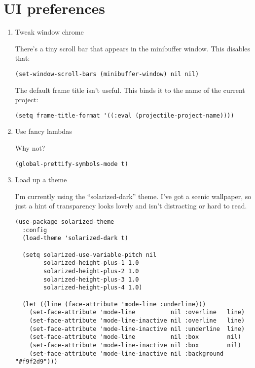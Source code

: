 \documentclass{article}
\begin{document}
\section{UI preferences}
\label{sec:orgae8d529}
\begin{enumerate}
\item Tweak window chrome
\label{sec:orgf8b1ac3}

There's a tiny scroll bar that appears in the minibuffer window. This disables
that:

\begin{verbatim}
(set-window-scroll-bars (minibuffer-window) nil nil)
\end{verbatim}

The default frame title isn't useful. This binds it to the name of the current
project:

\begin{verbatim}
(setq frame-title-format '((:eval (projectile-project-name))))
\end{verbatim}

\item Use fancy lambdas
\label{sec:orga78c289}

Why not?

\begin{verbatim}
(global-prettify-symbols-mode t)
\end{verbatim}

\item Load up a theme
\label{sec:orga727097}

I'm currently using the ``solarized-dark'' theme. I've got a scenic wallpaper, so
just a hint of transparency looks lovely and isn't distracting or hard to read.

\begin{verbatim}
(use-package solarized-theme
  :config
  (load-theme 'solarized-dark t)

  (setq solarized-use-variable-pitch nil
		solarized-height-plus-1 1.0
		solarized-height-plus-2 1.0
		solarized-height-plus-3 1.0
		solarized-height-plus-4 1.0)

  (let ((line (face-attribute 'mode-line :underline)))
	(set-face-attribute 'mode-line          nil :overline   line)
	(set-face-attribute 'mode-line-inactive nil :overline   line)
	(set-face-attribute 'mode-line-inactive nil :underline  line)
	(set-face-attribute 'mode-line          nil :box        nil)
	(set-face-attribute 'mode-line-inactive nil :box        nil)
	(set-face-attribute 'mode-line-inactive nil :background "#f9f2d9")))




\end{verbatim}
\end{enumerate}
\end{document}
